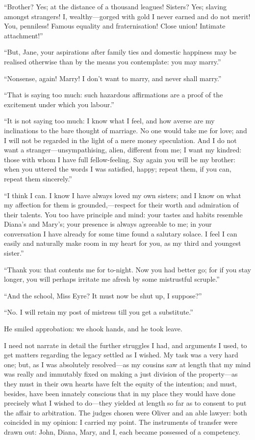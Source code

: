 \enquote{Brother? Yes; at the distance of a thousand leagues! 
Sisters? Yes; slaving amongst strangers! I, wealthy---gorged with gold
I never earned and do not merit! You, penniless! Famous equality and
fraternisation! Close union! Intimate attachment!}

\enquote{But, Jane, your aspirations after family ties and domestic
happiness may be realised otherwise than by the means you contemplate:
you may marry.}

\enquote{Nonsense, again! Marry! I don't want to marry, and never
shall marry.}

\enquote{That is saying too much: such hazardous affirmations are a
proof of the excitement under which you labour.}

\enquote{It is not saying too much: I know what I feel, and how averse
are my inclinations to the bare thought of marriage. No one would take
me for love; and I will not be regarded in the light of a mere money
speculation. And I do not want a stranger---unsympathising, alien,
different from me; I want my kindred: those with whom I have full
fellow-feeling. Say again you will be my brother: when you uttered the
words I was satisfied, happy; repeat them, if you can, repeat them
sincerely.}

\enquote{I think I can. I know I have always loved my own sisters; and
I know on what my affection for them is grounded,---respect for their
worth and admiration of their talents. You too have principle and mind:
your tastes and habits resemble Diana's and Mary's; your presence is
always agreeable to me; in your conversation I have already for some
time found a salutary solace. I feel I can easily and naturally make
room in my heart for you, as my third and youngest sister.}

\enquote{Thank you: that contents me for to-night. Now you had better
go; for if you stay longer, you will perhaps irritate me afresh by some
mistrustful scruple.}

\enquote{And the school, Miss Eyre? It must now be shut up, I suppose?}

\enquote{No. I will retain my post of mistress till you get a
substitute.}

He smiled approbation: we shook hands, and he took leave.

I need not narrate in detail the further struggles I had, and arguments
I used, to get matters regarding the legacy settled as I wished. My
task was a very hard one; but, as I was absolutely resolved---as my
cousins saw at length that my mind was really and immutably fixed on
making a just division of the property---as they must in their own
hearts have felt the equity of the intention; and must, besides, have
been innately conscious that in my place they would have done precisely
what I wished to do---they yielded at length so far as to consent to put
the affair to arbitration. The judges chosen were \Mr{} Oliver and an
able lawyer: both coincided in my opinion: I carried my point. The
instruments of transfer were drawn out: \St{} John, Diana, Mary, and I,
each became possessed of a competency.
